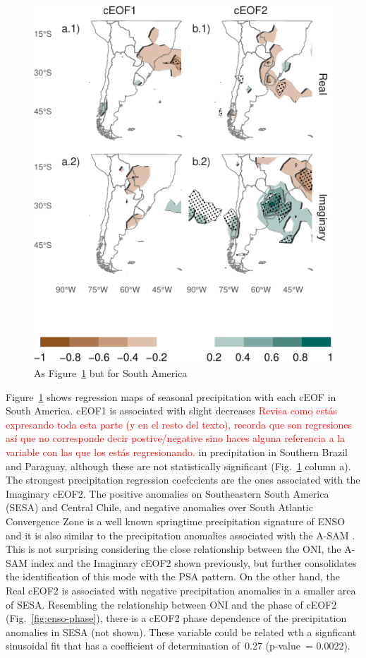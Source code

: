 \documentclass[smallextended]{svjour3}       %
\begin{document}
\begin{figure}
\centering
\includegraphics{../figures/pp-america-1.pdf}
\caption{\label{fig:pp-america}As Figure~\ref{fig:pp-america} but for South America}
\end{figure}

Figure~\ref{fig:pp-america} shows regression maps of seasonal precipitation with each cEOF in South America. cEOF1 is associated with slight decreases \textcolor{red}{Revisa como estás expresando toda esta parte (y en el resto del texto), recorda que son regresiones así que no corresponde decir postive/negative sino haces alguna referencia a la variable con las que los estás regresionando.} in precipitation in Southern Brazil and Paraguay, although these are not statistically significant (Fig.~\ref{fig:pp-america} column a). The strongest precipitation regression coefccients are the ones associated with the Imaginary cEOF2. The positive anomalies on Southeastern South America (SESA) and Central Chile, and negative anomalies over South Atlantic Convergence Zone is a well known springtime precipitation signature of ENSO \citep{cai2020a} and it is also similar to the precipitation anomalies associated with the A-SAM \citep{campitelli2021}.
This is not surprising considering the close relationship between the ONI, the A-SAM index and the Imaginary cEOF2 shown previously, but further consolidates the identification of this mode with the PSA pattern.
On the other hand, the Real cEOF2 is associated with negative precipitation anomalies in a smaller area of SESA.
Resembling the relationship between ONI and the phase of cEOF2 (Fig.~\ref{fig:enso-phase}), there is a cEOF2 phase dependence of the precipitation anomalies in SESA (not shown).
These variable could be related wth a signficant sinusoidal fit that has a coefficient of determination of~0.27 (p-value~= 0.0022).
\end{document}
